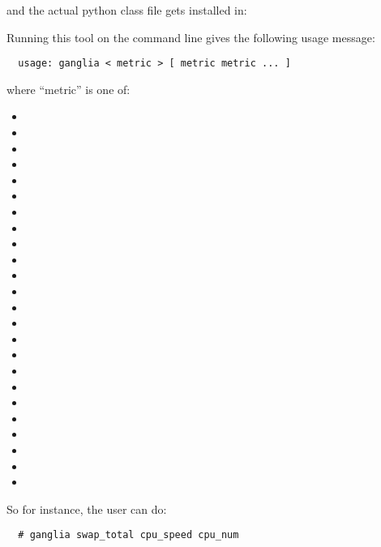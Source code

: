 \noindent and the actual python class file gets installed in:

\vspace{10pt}
\centerline{}
\vspace{10pt}

Running this tool on the command line gives the following usage
message:

\begin{verbatim}
  usage: ganglia < metric > [ metric metric ... ]
\end{verbatim}

where ``metric'' is one of:

\begin{itemize}
\item {}
\item {}
\item {}
\item {}
\item {}
\item {}
\item {}
\item {}
\item {}
\item {}
\item {}
\item {}
\item {}
\item {}
\item {}
\item {}
\item {}
\item {}
\item {}
\item {}
\item {}
\item {}
\item {}
\item {}
\end{itemize}

\noindent So for instance, the user can do:

\begin{verbatim}
  # ganglia swap_total cpu_speed cpu_num
\end{verbatim}

